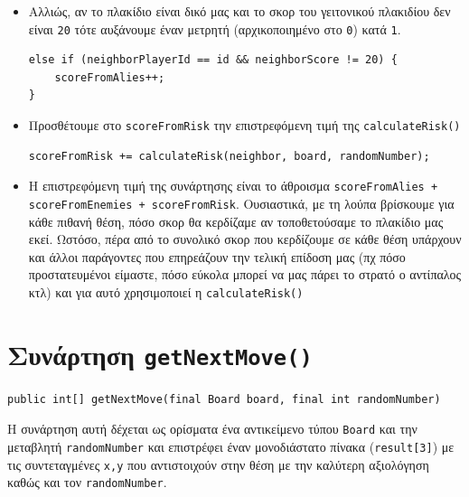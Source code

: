 \begin{itemize}
\item Αλλιώς, αν το πλακίδιο είναι δικό μας και το σκορ του γειτονικού πλακιδίου
δεν είναι \lstinline!20! τότε αυξάνουμε έναν μετρητή
(αρχικοποιημένο στο \lstinline!0!) κατά \lstinline!1!.
\begin{lstlisting}[numbers=none, aboveskip=\smallskipamount, belowskip=\smallskipamount, captionpos=none]
else if (neighborPlayerId == id && neighborScore != 20) {
    scoreFromAlies++;
}
\end{lstlisting}

\item Προσθέτουμε στο \lstinline!scoreFromRisk! την επιστρεφόμενη τιμή της \lstinline!calculateRisk()!
\begin{lstlisting}[numbers=none, aboveskip=\smallskipamount, belowskip=\smallskipamount, captionpos=none]
scoreFromRisk += calculateRisk(neighbor, board, randomNumber);
\end{lstlisting}

\item Η επιστρεφόμενη τιμή της συνάρτησης είναι το άθροισμα
\lstinline!scoreFromAlies + scoreFromEnemies + scoreFromRisk!.
Ουσιαστικά, με τη λούπα βρίσκουμε για κάθε πιθανή θέση, πόσο σκορ θα κερδίζαμε αν τοποθετούσαμε το πλακίδιο μας εκεί.
Ωστόσο, πέρα από το συνολικό σκορ που κερδίζουμε σε κάθε θέση υπάρχουν και άλλοι
παράγοντες που επηρεάζουν την τελική επίδοση μας (πχ πόσο προστατευμένοι είμαστε, πόσο εύκολα μπορεί να μας πάρει το στρατό ο αντίπαλος κτλ) και για αυτό χρησιμοποιεί η \lstinline!calculateRisk()!
\end{itemize}

\section{Συνάρτηση \texttt{getNextMove()}}
\begin{lstlisting}[numbers=none, title={Declaration της συνάρτησης}]
public int[] getNextMove(final Board board, final int randomNumber)
\end{lstlisting}
Η συνάρτηση αυτή δέχεται ως ορίσματα ένα αντικείμενο τύπου \lstinline!Board! και
την μεταβλητή \lstinline!randomNumber! και επιστρέφει έναν
μονοδιάστατο πίνακα (\lstinline!result[3]!) με τις συντεταγμένες \lstinline!x,y!
που αντιστοιχούν στην θέση με την καλύτερη αξιολόγηση καθώς και τον
\lstinline!randomNumber!.

